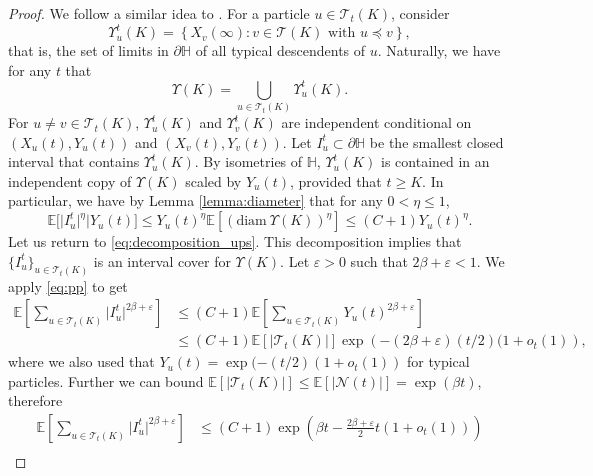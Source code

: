 \documentclass{article}
\theoremstyle{definition}
\numberwithin{equation}{section}
\numberwithin{thm}{section}
\newcommand*{\eps}{\ensuremath{\varepsilon}}            %
\newcommand*{\EE}{\ensuremath{\mathbb{E}}}	        	%
\newcommand*{\HH}{\ensuremath{\mathbb{H}}}	        	%
\newcommand*{\diam}{\ensuremath{\mathrm{diam} \ }}	        %
\begin{document}
\begin{proof}
    We follow a similar idea to \cite[Proposition 11]{lalley_hyperbolic_1997}. For a particle $u\in \mathcal{T}_t(K)$, consider
    \begin{equation*}
        \Upsilon_u^t(K)=\left\{X_v(\infty):v \in \mathcal{T}(K) \text{ with } u \preceq v \right\},
    \end{equation*}
    that is{,} the {set of} limits in $\partial \HH$ of all typical descendents of $u$. Naturally, we have for any $t$ that 
    \begin{equation}\label{eq:decomposition_ups}
        \Upsilon(K) = \bigcup_{u \in \mathcal{T}_t(K)}\Upsilon_u^t(K). 
    \end{equation}
    For $u\neq v \in \mathcal{T}_t(K)$, $\Upsilon_u^t(K)$ and $\Upsilon_v^t(K)$ are independent conditional on $(X_u(t),Y_u(t))$ and $(X_v(t), Y_v(t))$.
    Let $I_u^t \subset \partial \HH$ be the smallest closed interval that contains $\Upsilon_u^t(K)$. By isometries of $\HH$, $\Upsilon_u^t(K)$ is contained in an independent copy of $\Upsilon(K)$ scaled by $Y_u(t)$, provided that {$t\geq K$}. In particular{,} we have by Lemma \ref{lemma:diameter} that for any $0<\eta \leq 1$,
    \begin{equation}\label{eq:pp}
        \EE\big[ \vert  I_u^t \vert^\eta \big\vert Y_u(t) \big] \leq Y_u(t)^\eta \EE\left[(\diam \Upsilon(K))^\eta\right] \leq (C+1) Y_u(t)^\eta.
    \end{equation}
    {Let us return} to \eqref{eq:decomposition_ups}. This decomposition implies that $\{I_u^t\}_{u \in \mathcal{T}_t(K)}$ is an interval cover for $\Upsilon(K)$. Let $\eps> 0$ such that $2\beta+\eps<1$. We apply \eqref{eq:pp} {to get}
    \begin{align*}
        \EE\left[\sum_{u\in \mathcal{T}_t(K)}\vert I_u^t\vert^{2\beta + \eps}\right] &\leq (C+1)\EE\left[\sum_{u\in \mathcal{T}_t(K)}Y_u(t)^{2\beta + \eps}\right]  \\
         &\leq (C+1) \EE\left[\vert \mathcal{T}_t(K)\vert \right] \exp\left(-(2\beta+\eps)(t/2)(1+o_t(1)\right),
    \end{align*}
    where we also used that $Y_u(t) =\exp(-(t/2)(1+o_t(1))$ for typical particles. Further we can bound $\EE\left[\vert \mathcal{T}_t(K)\vert \right] \leq \EE[\vert \mathcal{N}(t)\vert]=\exp(\beta t)$, therefore
    \begin{align}
        \EE\left[\sum_{u\in \mathcal{T}_t(K)}\vert I_u^t\vert^{2\beta + \eps}\right]  &\leq (C+1) \exp\left(\beta t - \frac{2\beta+\eps}{2}t(1+o_t(1))\right) \nonumber\\

\end{align}
\end{proof}
\end{document}
